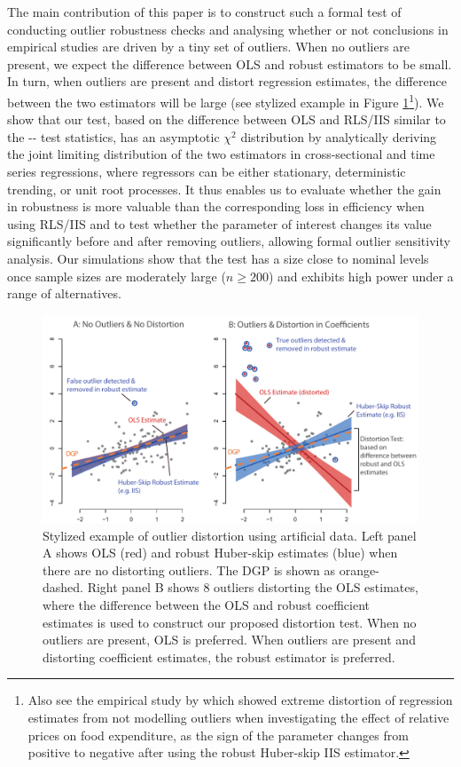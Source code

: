 \documentclass[11pt, letterpaper]{article}
\numberwithin{algorithm}{section}
\numberwithin{assumption}{section}
\numberwithin{lemma}{section}
\numberwithin{theorem}{section}
\numberwithin{corollary}{section}
\numberwithin{remark}{section}
\numberwithin{equation}{section}
\numberwithin{figure}{section}
\numberwithin{table}{section}
\begin{document}
The main contribution of this paper is to construct such a formal test of conducting outlier robustness checks and analysing whether or not conclusions in empirical studies are driven by a tiny set of outliers. When no outliers are present, we expect the difference between OLS and robust estimators to be small. In turn, when outliers are present and distort regression estimates, the difference between the two estimators will be large (see stylized example in Figure \ref{fig_out_styl}\footnote{Also see the empirical study by \cite{hendry2011econometric} which showed extreme distortion of regression estimates from not modelling outliers when investigating the effect of relative prices on food expenditure, as the sign of the parameter changes from positive to negative after using the robust Huber-skip IIS estimator.}). We show that our test, based on the difference between OLS and RLS/IIS similar to the \cite{durbin1954errors}-\cite{hausman1978specification}-\cite{wu1973alternative} test statistics, has an asymptotic $\chi^2$ distribution by analytically deriving the joint limiting distribution of the two estimators in cross-sectional and time series regressions, where regressors can be either stationary, deterministic trending, or unit root processes. It thus enables us to evaluate whether the gain in robustness is more valuable than the corresponding loss in efficiency when using RLS/IIS and to test whether the parameter of interest changes its value significantly before and after removing outliers, allowing formal outlier sensitivity analysis. Our simulations show that the test has a size close to nominal levels once sample sizes are moderately large ($n \geq 200$) and exhibits high power under a range of alternatives.

\begin{figure}[!htbp]
\centering
\includegraphics[scale=0.7]{stylized_example_simple_paper_v2.pdf}
\caption{Stylized example of outlier distortion using artificial data. Left panel A shows OLS (red) and robust Huber-skip estimates (blue) when there are no distorting outliers. The DGP is shown as orange-dashed. Right panel B shows 8 outliers distorting the OLS estimates, where the difference between the OLS and robust coefficient estimates is used to construct our proposed distortion test. When no outliers are present, OLS is preferred. When outliers are present and distorting coefficient estimates, the robust estimator is preferred.}
\label{fig_out_styl}
\end{figure}
\end{document}

